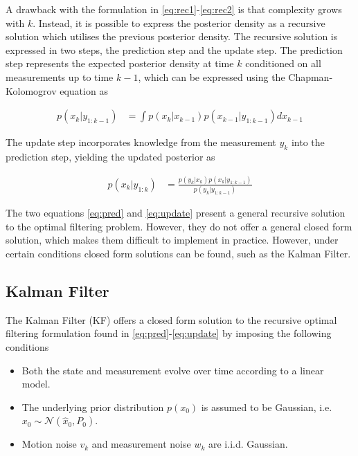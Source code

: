 A drawback with the formulation in \eqref{eq:rec1}-\eqref{eq:rec2} is that complexity grows with $k$. Instead, it is possible to express the posterior density as a recursive solution which utilises the previous posterior density. The recursive solution is expressed in two steps, the prediction step and the update step. The prediction step represents the expected posterior density at time $k$ conditioned on all measurements up to time $k-1$, which can be expressed using the Chapman-Kolomogrov equation as  

\begin{equation}
    \begin{split}
        p(x_k|y_{1:k-1}) &= \int p(x_k|x_{k-1})p(x_{k-1}|y_{1:k-1})dx_{k-1}
    \end{split}\label{eq:pred}
\end{equation}

The update step incorporates knowledge from the measurement $y_k$ into the prediction step, yielding the updated posterior as

\begin{equation}
    \begin{split}
        p(x_k|y_{1:k}) &= \frac{p(y_k|x_k)p(x_k|y_{1:k-1})}{p(y_k|y_{1:k-1})}
    \end{split}\label{eq:update}
\end{equation}

The two equations \eqref{eq:pred} and \eqref{eq:update} present a general recursive solution to the optimal filtering problem. However, they do not offer a general closed form solution, which makes them difficult to implement in practice. However, under certain conditions closed form solutions can be found, such as the Kalman Filter. 

\subsection{Kalman Filter}
The Kalman Filter (KF) offers a closed form solution to the recursive optimal filtering formulation found in \eqref{eq:pred}-\eqref{eq:update} by imposing the following conditions

\begin{itemize}
    \item Both the state and measurement evolve over time according to a linear model.
    \item The underlying prior distribution $p(x_0)$ is assumed to be Gaussian, i.e. $x_0 \sim \mathcal{N}(\hat{x}_0,P_0)$.
    \item Motion noise $v_k$ and measurement noise $w_k$ are i.i.d. Gaussian.
\end{itemize}

